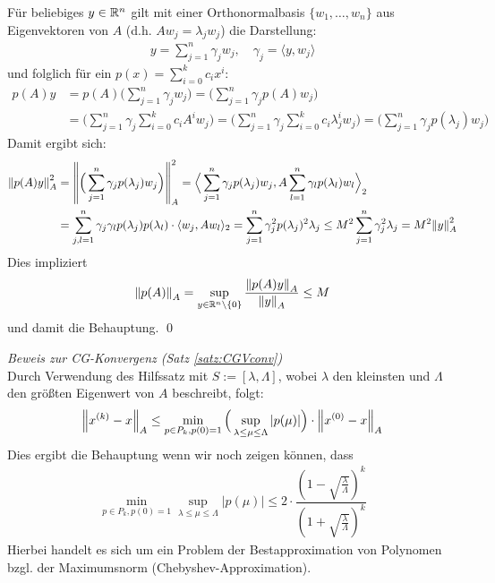 Für beliebiges $y\in\mathbb R^n$ gilt mit einer Orthonormalbasis $\{w_1,\dots,w_n\}$ aus Eigenvektoren von $A$ 
(d.h. $Aw_j = \lambda_jw_j$) die Darstellung:
%
\begin{align*}
  y=\sum_{j=1}^{n}\gamma_j w_j,
  \quad \gamma_j = \langle y, w_j\rangle
\end{align*}
%
und folglich für ein $p(x) = \sum_{i=0}^{k} c_i x^i$:
\begin{align*}
  p(A)y 
  &= p(A) \Bigg(\sum_{j=1}^{n}\gamma_j w_j \Bigg) 
  = \Bigg(\sum_{j=1}^{n}\gamma_j p(A)w_j \Bigg) \\
  &= \Bigg(\sum_{j=1}^{n}\gamma_j \sum_{i=0}^{k} c_i A^iw_j \Bigg) 
  = \Bigg(\sum_{j=1}^{n}\gamma_j \sum_{i=0}^{k} c_i \lambda_j^iw_j \Bigg) 
  = \Bigg(\sum_{j=1}^{n}\gamma_j p(\lambda_j)w_j \Bigg)
\end{align*}
%
Damit ergibt sich:
\begin{align*}
  \vertn{2}{p(A)y}_A^2 
  &= \vertn{2}{
    \Big(\sum_{j=1}^{n}\gamma_j p(\lambda_j)w_j\Big)
  }_A^2
  = \Big\langle \sum_{j=1}^{n}\gamma_j p(\lambda_j)w_j, A\sum_{l=1}^{n}\gamma_l p(\lambda_l)w_l\Big\rangle_2\\
  &= \sum_{j,l=1}^{n} \gamma_j\gamma_l p(\lambda_j)p(\lambda_l) \cdot\langle w_j,Aw_l\rangle_2
  = \sum_{j=1}^{n} \gamma_j^2 p(\lambda_j)^2 \lambda_j 
  \leq M^2 \sum_{j=1}^{n} \gamma_j^2 \lambda_j 
  = M^2 \vertn{2}{y}_A^2
\end{align*}
%
Dies impliziert 
%
\begin{align*}
  \vertn{2}{p(A)}_A = \sup_{y\in\R^n\backslash\{0\}} \dfrac{\vertn{2}{p(A)y}_A}{\vertn{2}{y}_A}\leq M
\end{align*}
%
und damit die Behauptung. \qed 

\textit{Beweis zur CG-Konvergenz (Satz \ref{satz:CGVconv})}\\
Durch Verwendung des Hilfssatz mit $S:=[\lambda, \Lambda]$, 
wobei $\lambda$ den kleinsten und $\Lambda$ den größten Eigenwert von $A$ beschreibt, folgt:
%
\begin{align*}
  \vertn{2}{x^{(k)}-x}_A \leq \min_{p\in P_{k}, p(0)=1} 
  \Big(\sup_{\lambda\leq\mu\leq\Lambda}|p(\mu)|\Big)\cdot\vertn{2}{x^{(0)}-x}_A 
\end{align*}
%
Dies ergibt die Behauptung wenn wir noch zeigen können, dass 
%
\begin{align*}
  \min_{p\in P_{k}, p(0)=1} \sup_{\lambda\leq\mu\leq\Lambda}|p(\mu)| 
  \leq 2\cdot \dfrac{(1-\sqrt{\tfrac{\lambda}{\Lambda}})^k}{(1+\sqrt{\tfrac{\lambda}{\Lambda}})^k}
\end{align*}
%
Hierbei handelt es sich um ein Problem der Bestapproximation von Polynomen bzgl. 
der Maximumsnorm (Chebyshev-Approximation).

